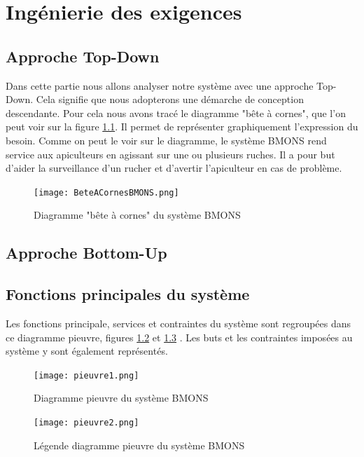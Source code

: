 \chapter{Ingénierie des exigences}
\section{Approche Top-Down}

Dans cette partie nous allons analyser notre système avec une approche Top-Down. Cela signifie que nous adopterons une démarche de conception descendante. Pour cela nous avons tracé le diagramme "bête à cornes", que l'on peut voir sur la figure \ref{fig:beteacorne}. Il permet de représenter graphiquement l'expression du besoin. Comme on peut le voir sur le diagramme, le système BMONS rend service aux apiculteurs en agissant sur une ou plusieurs ruches. Il a pour but d'aider la surveillance d'un rucher et d'avertir l'apiculteur en cas de problème.


\begin{figure}[h!]
\centering\texttt{[image: BeteACornesBMONS.png]}
\caption{\label{fig:beteacorne} Diagramme "bête à cornes" du système BMONS}
\end{figure}

\clearpage

\section{Approche Bottom-Up}

\section{Fonctions principales du système}

Les fonctions principale, services et contraintes du système sont regroupées dans ce diagramme pieuvre, figures \ref{fig:diagpieuvre1} et \ref{fig:diagpieuvre2} . Les buts et les contraintes imposées au système y sont également représentés. 
 
\begin{figure}[h!]
\centering\texttt{[image: pieuvre1.png]}
\caption{\label{fig:diagpieuvre1} Diagramme pieuvre du système BMONS}
\end{figure}

\begin{figure}[h!]
\centering\texttt{[image: pieuvre2.png]}
\caption{\label{fig:diagpieuvre2} Légende diagramme pieuvre du système BMONS}
\end{figure}


